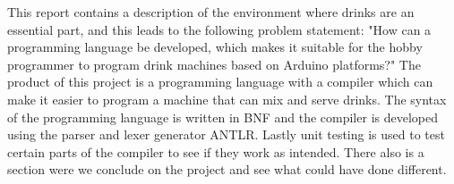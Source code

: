 This report contains a description of the environment where drinks are an essential part, and this leads to the following problem statement:
"How can a programming language be developed, which makes it suitable for the hobby programmer to program drink machines based on Arduino platforms?"
The product of this project is a programming language with a compiler which can make it easier to program a machine that can mix and serve drinks. The syntax of the programming language is written in BNF and the compiler is developed using the parser and lexer generator ANTLR. Lastly unit testing is used to test certain parts of the compiler to see if they work as intended. There also is a section were we conclude on the project and see what could have done different.